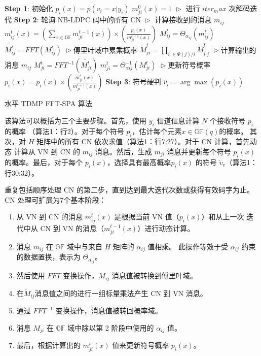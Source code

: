 \documentclass{cjc}
\begin{document}
\begin{algorithm}[htb]
  \begin{algorithmic}[1]
    \STATE \textbf{Step 1}: 初始化
    \STATE $p_i(x)=p(v_i=x|y_i)$
    \STATE $m^0_{ji}(x)=1$
    \STATE $\vartriangleright$ 进行 $iter_max$ 次解码迭代
      \STATE \textbf{Step 2}: 轮询 NB-LDPC 码中的所有 CN
        \STATE$\vartriangleright$ 计算接收到的消息 $m_{ij}$
          \STATE $m_{i j}^{t}(x)=\left(\sum_{x \in \mathbb{G} \mathbb{F}} m_{j i}^{t-1}(x)\right) \times\left(\frac{p_{i}(x)}{m_{j i}^{t-1}(x)}\right)$
          \STATE $M^t_{ij}=\Theta_{\alpha_{ij}}(m^t_{ij})$
          \STATE $\tilde{M^t_{ij}}=FFT(M^t_{ij})$
        \ENDFOR
        \STATE$\vartriangleright$傅里叶域中累乘概率
          \STATE $\tilde{M}_{j i}^{t}=\prod_{i^{\prime} \in \Psi(j) / i} \tilde{M}_{i^{\prime} j}^{t}$
        \ENDFOR
        \STATE$\vartriangleright$计算输出的消息 $m_{ij}$
          \STATE $M^t_{ji}=FFT^{-1}(\tilde{M^t_{ji}})$
          \STATE $m^t_{ji}=\Theta^{-1}_{\alpha{ij}}(M^t_{ji})$
        \ENDFOR
        \STATE$\vartriangleright$更新符号概率
          \STATE $p_i(x)=p_i(x)\times(\frac{m^t_{ji}(x)}{m^{t-1}_{ji}(x)})$
        \ENDFOR
      \ENDFOR
    \ENDFOR
    \STATE\textbf{Step 3}: 符号硬判
      \STATE $\hat{v}_{i}=\arg \max \left(p_{i}(x)\right)$
    \ENDFOR
  \end{algorithmic}
  \caption{ 水平 TDMP FFT-SPA 算法}
  \label{alg:1}
\end{algorithm}

  该算法可以概括为三个主要步骤。首先，使用 $y_i$ 信道信息计算 $N$ 个接收符号 $p_i$ 的概率
  （算法1：行2）。对于每个符号 $p_i$，估计每个元素$x\in\mathbb{GF}(q)$的概率。
  其次，对 $H$ 矩阵中的所有 CN 依次求值（算法1：行7:27）。对于 CN 计算，首先动态
  计算从 VN 到 CN 的 $m_{ij}$ 消息。然后，生成 $m_{ji}$ 消息并更新每个符号
  $p_i(x)$ 的概率。最后，对于每个 $p_i(x)$，选择具有最高概率$p_i(x)$ 的符号
  $\tilde{v}_v$（算法1：行30:32）。

  重复包括顺序处理 CN 的第二步，直到达到最大迭代次数或获得有效码字为止。CN 处理可扩展为7个基本阶段：
\begin{enumerate}
  \item 从 VN 到 CN 的消息 $m^t_{ij}(x)$ 是根据当前 VN 值（$p_i(x)$）和从上一次
  迭代中从 CN 到 VN 的消息（$m^{t-1}_{ji}(x)$）进行动态计算。
  \item 消息 $m_{ij}$ 在 $\mathbb{GF}$ 域中与来自 $H$ 矩阵的 $\alpha_{ij}$ 值相乘。
  此操作等效于受 $\alpha_{ij}$ 约束的数据置换，表示为 $\Theta_{\alpha_{ij}}$。
  \item 然后使用 $FFT$ 变换操作，$M_{ij}$ 消息值被转换到傅里叶域。
  \item 在$\tilde{M}_{ij}$消息值之间的进行一组标量乘法产生 CN 到 VN 消息。
  \item 通过 $FFT^{-1}$ 变换操作，消息值被转回概率域。 
  \item 消息 $M_{ji}$ 在 $\mathbb{GF}$ 域中除以第 2 阶段中使用的 $\alpha_{ij}$ 值。
  \item 最后，根据计算出的 $m^t_{ji}(x)$ 值来更新符号概率 $p_i(x)$。
\end{enumerate}
\end{document}
